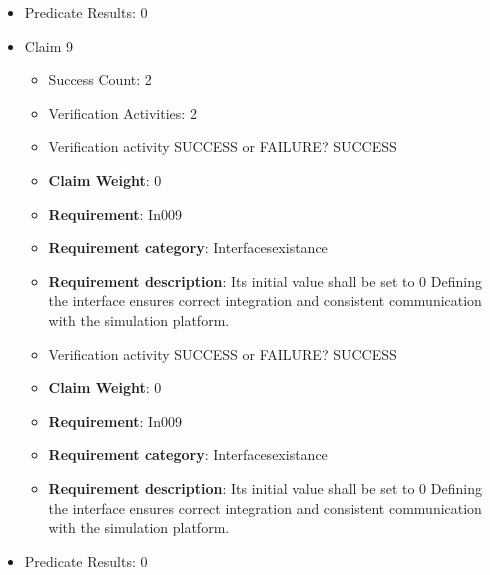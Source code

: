 \documentclass{article}
\begin{document}
\begin{itemize}
\begin{itemize}
					\item Verification activity SUCCESS or FAILURE? SUCCESS
					\item \textbf{Claim Weight}: 0
						\item \textbf{Requirement}: In008 
						\item \textbf{Requirement category}: Interfacesexistance 
						\item \textbf{Requirement description}: Its initial value shall be set to 0 Defining the interface ensures correct integration and consistent communication with the simulation platform.
					
				\end{itemize}
				
									    
				\item Predicate Results: 0

  				  \item Claim 9
				\begin{itemize}
			    	\item Success Count: 2 
			    	\item Verification Activities: 2
					\item Verification activity SUCCESS or FAILURE? SUCCESS
					\item \textbf{Claim Weight}: 0
						\item \textbf{Requirement}: In009 
						\item \textbf{Requirement category}: Interfacesexistance 
						\item \textbf{Requirement description}: Its initial value shall be set to 0 Defining the interface ensures correct integration and consistent communication with the simulation platform.
					
					\item Verification activity SUCCESS or FAILURE? SUCCESS
					\item \textbf{Claim Weight}: 0
						\item \textbf{Requirement}: In009 
						\item \textbf{Requirement category}: Interfacesexistance 
						\item \textbf{Requirement description}: Its initial value shall be set to 0 Defining the interface ensures correct integration and consistent communication with the simulation platform.
					
				\end{itemize}
				
									    
				\item Predicate Results: 0


\end{itemize}
\end{document}
